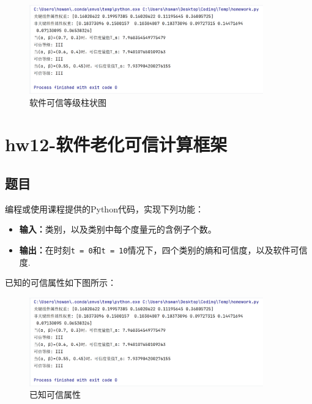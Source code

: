 \documentclass{article}
\begin{document}
\begin{figure}[H]
	\centering
	\includegraphics[width=0.9\textwidth]{img/1.png}
	\caption{软件可信等级柱状图}
\end{figure}










\section{hw12-软件老化可信计算框架}

\subsection{题目}

编程或使用课程提供的Python代码，实现下列功能：

\begin{itemize}
	\item \textbf{输入：}类别，以及类别中每个度量元的含例子个数。
	\item \textbf{输出：}在时刻\texttt{t = 0}和\texttt{t = 10}情况下，四个类别的熵和可信度，以及软件可信度.
\end{itemize}

已知的可信属性如下图所示：

\begin{figure}[H]
	\centering
	\includegraphics[width=0.9\textwidth]{img/1.png}
	\caption{已知可信属性}
\end{figure}
\end{document}
